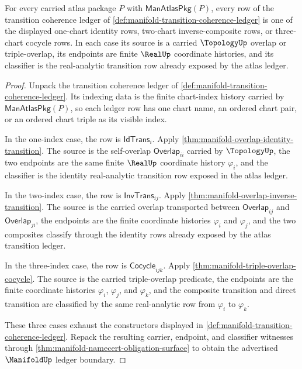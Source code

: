 \begin{theorem}
\label{thm:manifoldup-transition-coherence-exhaustion}
For every carried atlas package $P$ with $\mathsf{ManAtlasPkg}(P)$, every row
of the transition coherence ledger of
\autoref{def:manifold-transition-coherence-ledger} is one of the displayed
one-chart identity rows, two-chart inverse-composite rows, or three-chart
cocycle rows. In each case its source is a carried $\TopologyUp$ overlap or
triple-overlap, its endpoints are finite $\RealUp$ coordinate histories, and
its classifier is the real-analytic transition row already exposed by the
atlas ledger.
\end{theorem}
\begin{proof}
Unpack the transition coherence ledger of
\autoref{def:manifold-transition-coherence-ledger}. Its indexing data is the
finite chart-index history carried by $\mathsf{ManAtlasPkg}(P)$, so each
ledger row has one chart name, an ordered chart pair, or an ordered chart
triple as its visible index.

In the one-index case, the row is $\mathsf{IdTrans}_i$. Apply
\autoref{thm:manifold-overlap-identity-transition}. The source is the
self-overlap $\mathsf{Overlap}_{ii}$ carried by $\TopologyUp$, the two
endpoints are the same finite $\RealUp$ coordinate history $\varphi_i$, and
the classifier is the identity real-analytic transition row exposed in the
atlas ledger.

In the two-index case, the row is $\mathsf{InvTrans}_{ij}$. Apply
\autoref{thm:manifold-overlap-inverse-transition}. The source is the carried
overlap transported between $\mathsf{Overlap}_{ij}$ and
$\mathsf{Overlap}_{ji}$, the endpoints are the finite coordinate histories
$\varphi_i$ and $\varphi_j$, and the two composites classify through the
identity rows already exposed by the atlas transition ledger.

In the three-index case, the row is $\mathsf{Cocycle}_{ijk}$. Apply
\autoref{thm:manifold-triple-overlap-cocycle}. The source is the carried
triple-overlap predicate, the endpoints are the finite coordinate histories
$\varphi_i$, $\varphi_j$, and $\varphi_k$, and the composite transition and
direct transition are classified by the same real-analytic row from
$\varphi_i$ to $\varphi_k$.

These three cases exhaust the constructors displayed in
\autoref{def:manifold-transition-coherence-ledger}. Repack the resulting
carrier, endpoint, and classifier witnesses through
\autoref{thm:manifold-namecert-obligation-surface} to obtain the advertised
$\ManifoldUp$ ledger boundary.
\end{proof}

